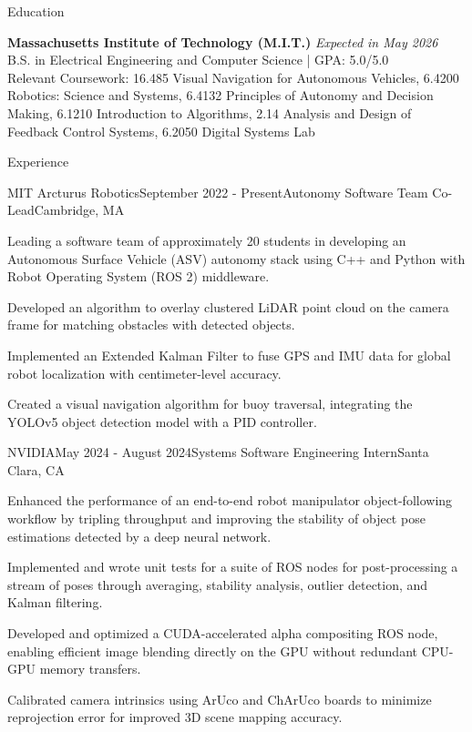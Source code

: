 \documentclass[
	10pt,
]{resume}
\begin{document}
\begin{rSection}{Education}

	\textbf{Massachusetts Institute of Technology (M.I.T.)} \hfill \textit{Expected in May 2026} \\ 
	B.S. in Electrical Engineering and Computer Science | GPA: 5.0/5.0 \\
    Relevant Coursework: 16.485 Visual Navigation for Autonomous Vehicles, 6.4200 Robotics: Science and Systems, 6.4132 Principles of Autonomy and Decision Making, 6.1210 Introduction to Algorithms, 2.14 Analysis and Design of Feedback Control Systems, 6.2050 Digital Systems Lab
\end{rSection}

\begin{rSection}{Experience}

	\begin{rSubsection}{MIT Arcturus Robotics}{September 2022 - Present}{Autonomy Software Team Co-Lead}{Cambridge, MA}
    \item Leading a software team of approximately 20 students in developing an Autonomous Surface Vehicle (ASV) autonomy stack using C++ and Python with Robot Operating System (ROS 2) middleware.
    \item Developed an algorithm to overlay clustered LiDAR point cloud on the camera frame for matching obstacles with detected objects.
    \item Implemented an Extended Kalman Filter to fuse GPS and IMU data for global robot localization with centimeter-level accuracy.
    \item Created a visual navigation algorithm for buoy traversal, integrating the YOLOv5 object detection model with a PID controller.
    \end{rSubsection}

	\begin{rSubsection}{NVIDIA}{May 2024 - August 2024}{Systems Software Engineering Intern}{Santa Clara, CA}
    \item Enhanced the performance of an end-to-end robot manipulator object-following workflow by tripling throughput and improving the stability of object pose estimations detected by a deep neural network.
    \item Implemented and wrote unit tests for a suite of ROS nodes for post-processing a stream of poses through averaging, stability analysis, outlier detection, and Kalman filtering.
    \item Developed and optimized a CUDA-accelerated alpha compositing ROS node, enabling efficient image blending directly on the GPU without redundant CPU-GPU memory transfers.
    \item Calibrated camera intrinsics using ArUco and ChArUco boards to minimize reprojection error for improved 3D scene mapping accuracy.
    \end{rSubsection}


\end{rSection}
\end{document}
